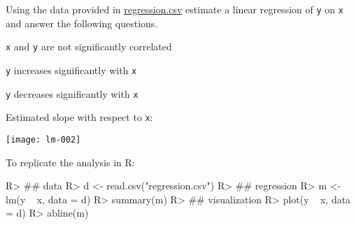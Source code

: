 
\begin{question}
Using the data provided in \url{regression.csv} estimate a linear regression of
\texttt{y} on \texttt{x} and answer the following questions.

\begin{answerlist}
  \item \texttt{x} and \texttt{y} are not significantly correlated
  \item \texttt{y} increases significantly with \texttt{x}
  \item \texttt{y} decreases significantly with \texttt{x}
  \item Estimated slope with respect to \texttt{x}:
\end{answerlist}
 
\end{question}

\begin{solution}
\texttt{[image: lm-002]}

To replicate the analysis in R:
\begin{Schunk}
\begin{Sinput}
R> ## data
R> d <- read.csv("regression.csv")
R> ## regression
R> m <- lm(y ~ x, data = d)
R> summary(m)
R> ## visualization
R> plot(y ~ x, data = d)
R> abline(m)
\end{Sinput}
\end{Schunk}

\end{solution}

